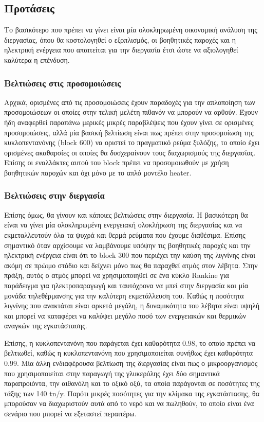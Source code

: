 \documentclass[11pt]{article}
\begin{document}
\subsection{Προτάσεις}
\label{sec:org392a990}
Το βασικότερο που πρέπει να γίνει είναι μία ολοκληρωμένη οικονομική ανάλυση της διεργασίας, όπου θα κοστολογηθεί ο εξοπλισμός, οι βοηθητικές παροχές και η ηλεκτρική ενέργεια που απαιτείται για την διεργασία έτσι ώστε να αξιολογηθεί καλύτερα η επένδυση.
\subsubsection{Βελτιώσεις στις προσομοιώσεις}
\label{sec:org0c0f9b9}
Αρχικά, ορισμένες από τις προσομοιώσεις έχουν παραδοχές για την απλοποίηση των προσομοιώσεων οι οποίες στην τελική μελέτη πιθανόν να μπορούν να αρθούν. Έχουν ήδη αναφερθεί παραπάνω μερικές μικρές παραβλέψεις που έχουν γίνει σε ορισμένες προσομοιώσεις, αλλά μία βασική βελτίωση είναι πως πρέπει στην προσομοίωση της κυκλοπεντανόνης (block 600) να οριστεί το πραγματικό ρεύμα ξυλόζης, το οποίο έχει ορισμένες ακαθαρσίες οι οποίες θα δυσχεραίνουν τους διαχωρισμούς της διεργασίας. Επίσης οι εναλλάκτες αυτού του block πρέπει να προσομοιωθούν με χρήση βοηθητικών παροχών και όχι μόνο με το απλό μοντέλο heater.

\subsubsection{Βελτιώσεις στην διεργασία}
\label{sec:orgd702a92}
Επίσης όμως, θα γίνουν και κάποιες βελτιώσεις στην διεργασία. Η βασικότερη θα είναι να γίνει μία ολοκληρωμένη ενεργειακή ολοκλήρωση της διεργασίας και να εκμεταλλευτούν όλα τα ψυχρά και θερμά ρεύματα που έχουμε διαθέσιμα. Επίσης σημαντικό όταν αρχίσουμε να λαμβάνουμε υπόψην τις βοηθητικές παροχές και την ηλεκτρική ενέργεια είναι ότι το block 300 που περιέχει την καύση της λιγνίνης είναι ακόμη σε πρώιμο στάδιο και δείχνει μόνο πως θα παραχθεί ατμός στον λέβητα. Στην πράξη, αυτός ο ατμός μπορεί να χρησιμοποιηθεί σε ένα κύκλο Rankine για παράδειγμα για ηλεκτροπαραγωγή και ταυτόχρονα να μπεί στην διεργασία και μία μονάδα τηλεθέρμανσης για την καλύτερη εκμετάλλευση του. Καθώς η ποσότητα λιγνίνης που ανακτάται είναι αρκετά μεγάλη, η δυναμικότητα του λέβητα είναι υψηλή και μπορεί να καταφέρει να καλύψει μεγάλο ποσό των ενεργειακών και θερμικών αναγκών της εγκατάστασης.

Επίσης, η κυκλοπεντανόνη που παράγεται έχει καθαρότητα 0.98, το οποίο πρέπει να βελτιωθεί, καθώς η κυκλοπεντανόνη που χρησιμοποιείται συνήθως έχει καθαρότητα 0.99. Μία άλλη ενδιαφέρουσα βελτίωση της διεργασίας είναι πως ο μικροοργανισμός που χρησιμοποιείται στην παραγωγή της γλυκερόλης έχει δύο σημαντικά παραπροιόντα, την αιθανόλη και το οξικό οξύ, τα οποία παράγονται σε ποσότητες της τάξης των 140 tn/y. Παρότι μικρές ποσότητες για την κλίμακα της εγκατάστασης, θα μπορούσαν να διαχωριστούν αυτά από το νερό και να πωληθούν, το οποίο είναι ένα σενάριο που μπορεί να εξεταστεί περαιτέρω.
\end{document}
